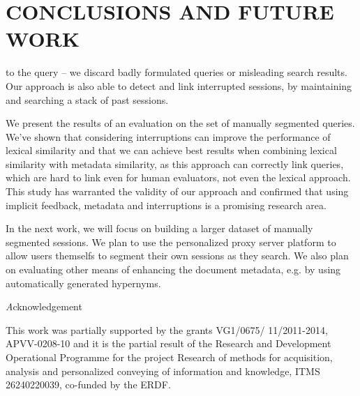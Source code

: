 \documentclass{acm_proc_article-sp} %
\begin{document}
\section{CONCLUSIONS AND FUTURE WORK}

to the query – we discard badly formulated queries or misleading
search results. Our approach is also able to detect
and link interrupted sessions, by maintaining and searching
a stack of past sessions.

We present the results of an evaluation on the set of manually
segmented queries. We’ve shown that considering interruptions
can improve the performance of lexical similarity
and that we can achieve best results when combining lexical
similarity with metadata similarity, as this approach can
correctly link queries, which are hard to link even for human
evaluators, not even the lexical approach. This study
has warranted the validity of our approach and confirmed
that using implicit feedback, metadata and interruptions is
a promising research area.

In the next work, we will focus on building a larger dataset
of manually segmented sessions. We plan to use the personalized
proxy server platform to allow users themselfs to
segment their own sessions as they search. We also plan on
evaluating other means of enhancing the document metadata,
e.g. by using automatically generated hypernyms.

\textit Acknowledgement

This work was partially supported by the grants VG1/0675/
11/2011-2014, APVV-0208-10 and it is the partial result of
the Research and Development Operational Programme for
the project Research of methods for acquisition, analysis
and personalized conveying of information and knowledge,
ITMS 26240220039, co-funded by the ERDF.







\balancecolumns
\end{document}
